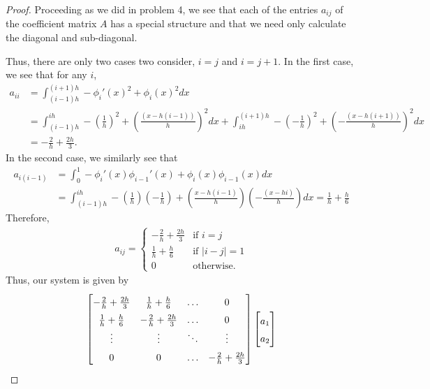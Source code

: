 \begin{proof}
  Proceeding as we did in problem 4, we see that each of the entries $a_{ij}$
  of the coefficient matrix $A$
  has a special structure and that we need only calculate the diagonal and sub-diagonal.

  Thus, there are only two cases two consider, $i = j$ and $i = j + 1$.
  In the first case, we see that for any $i$,
  \begin{align*}
    a_{ii}
    &= \int_{(i-1)h}^{(i+1)h}-\phi_i'(x)^2 + \phi_i(x)^2 dx \\
    &= \int_{(i-1)h}^{ih} - \left(\frac{1}{h}\right)^2 + \left(\frac{(x - h(i-1))}{h}\right)^2 dx +
    \int_{ih}^{(i+1)h} - \left(-\frac{1}{h}\right)^2 + \left(-\frac{(x - h(i+1))}{h}\right)^2 dx \\
    &= - \frac{2}{h} + \frac{2h}{3}.
  \end{align*}
  In the second case, we similarly see that
  \begin{align*}
    a_{i(i-1)} &=
    \int_{0}^1 -\phi_{i}'(x)\phi_{i-1}'(x) + \phi_{i}(x)\phi_{i-1}(x) dx \\
    &= \int_{(i-1)h}^{ih} -\left(\frac{1}{h}\right)\left(-\frac{1}{h}\right) + \left(\frac{x - h(i-1)}{h}\right)\left(-\frac{(x - hi)}{h}\right)dx
    = \frac{1}{h} + \frac{h}{6}
  \end{align*}
  Therefore,
  \begin{align*}
    a_{ij} =
    \begin{cases}
      - \frac{2}{h} + \frac{2h}{3} & \text{if $i = j$} \\
      \frac{1}{h} + \frac{h}{6} & \text{if $|i - j| = 1$} \\
      0 & \text{otherwise}.
    \end{cases}
  \end{align*}
  Thus, our system is given by
  \begin{align*}
    \renewcommand\arraystretch{1.5}
    \begin{bmatrix}
      - \frac{2}{h} + \frac{2h}{3} & \frac{1}{h} + \frac{h}{6} & \hdots & 0 \\
      \frac{1}{h} + \frac{h}{6} & - \frac{2}{h} + \frac{2h}{3} & \hdots & 0 \\
      \vdots & \vdots & \ddots & \vdots  \\
      0 & 0 & \hdots & - \frac{2}{h} + \frac{2h}{3} \\
    \end{bmatrix}
    \begin{bmatrix}
      a_1 \\
      a_2 \\

\end{bmatrix}
\end{align*}
\end{proof}

